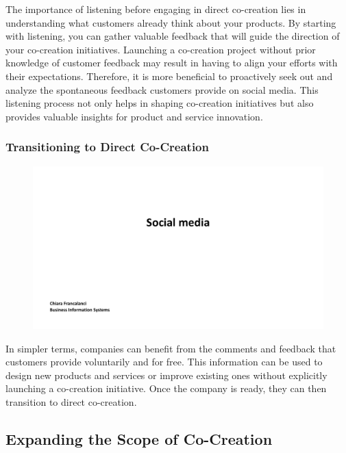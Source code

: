 The importance of listening before engaging in direct co-creation lies
in understanding what customers already think about your products. By
starting with listening, you can gather valuable feedback that will
guide the direction of your co-creation initiatives. Launching a
co-creation project without prior knowledge of customer feedback may
result in having to align your efforts with their expectations.
Therefore, it is more beneficial to proactively seek out and analyze the
spontaneous feedback customers provide on social media. This listening
process not only helps in shaping co-creation initiatives but also
provides valuable insights for product and service innovation.

\subsubsection{Transitioning to Direct
  Co-Creation}\label{transitioning-to-direct-co-creation}

\begin{figure}[!h]
  \centering
  \includegraphics[page=13, trim = 1cm 6cm 3cm 4cm, clip, width=\imagewidth]{images/04 - Social_Media.pdf}
\end{figure}

In simpler terms, companies can benefit from the comments and feedback
that customers provide voluntarily and for free. This information can be
used to design new products and services or improve existing ones
without explicitly launching a co-creation initiative. Once the company
is ready, they can then transition to direct co-creation.

\subsection{Expanding the Scope of
  Co-Creation}\label{expanding-the-scope-of-co-creation}

